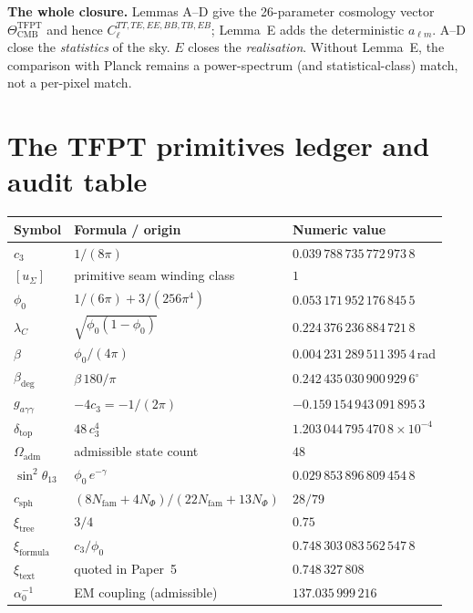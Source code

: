 \bigskip

\noindent
\textbf{The whole closure.}  Lemmas A--D give the 26-parameter
cosmology vector
\(\Theta_{\mathrm{CMB}}^{\mathrm{TFPT}}\) and hence
\(C_\ell^{TT,TE,EE,BB,TB,EB}\); Lemma~E adds the deterministic
\(a_{\ell m}\).  A--D close the \emph{statistics} of the sky.
\(E\) closes the \emph{realisation}.  Without Lemma~E, the comparison
with Planck remains a power-spectrum (and statistical-class) match,
not a per-pixel match.

\section{The TFPT primitives ledger and audit table}
\label{sec:ledger}

\begin{center}
\renewcommand{\arraystretch}{1.05}
\begin{tabular}{@{}lll@{}}
\toprule
\textbf{Symbol} & \textbf{Formula / origin} & \textbf{Numeric value} \\
\midrule
\(c_3\)               & \(1/(8\pi)\)
& \(0.039\,788\,735\,772\,973\,8\) \\
\([u_\Sigma]\)            & primitive seam winding class
& \(1\) \\
\(\phi_0\)                 & \(1/(6\pi)+3/(256\pi^4)\)
& \(0.053\,171\,952\,176\,845\,5\) \\
\(\lambda_C\)             & \(\sqrt{\phi_0(1-\phi_0)}\)
& \(0.224\,376\,236\,884\,721\,8\) \\
\(\beta\)  & \(\phi_0/(4\pi)\)
& \(0.004\,231\,289\,511\,395\,4\,\)rad \\
\(\beta_{\mathrm{deg}}\)  & \(\beta\,180/\pi\)
& \(0.242\,435\,030\,900\,929\,6^\circ\) \\
\(g_{a\gamma\gamma}\)     & \(-4c_3=-1/(2\pi)\)
& \(-0.159\,154\,943\,091\,895\,3\) \\
\(\delta_{\mathrm{top}}\) & \(48\,c_3^4\)
& \(1.203\,044\,795\,470\,8\times10^{-4}\) \\
\(\Omega_{\mathrm{adm}}\)& admissible state count
& \(48\) \\
\(\sin^2\theta_{13}\)     & \(\phi_0\,e^{-\gamma}\)
& \(0.029\,853\,896\,809\,454\,8\) \\
\(c_{\mathrm{sph}}\)      & \((8N_{\mathrm{fam}}+4N_\Phi)/(22N_{\mathrm{fam}}+13N_\Phi)\) & \(28/79\) \\
\(\xi_{\mathrm{tree}}\)   & \(3/4\)                                    & \(0.75\) \\
\(\xi_{\mathrm{formula}}\)& \(c_3/\phi_0\)                          & \(0.748\,303\,083\,562\,547\,8\) \\
\(\xi_{\mathrm{text}}\)   & quoted in Paper~5                          & \(0.748\,327\,808\) \\
\(\alpha_0^{-1}\)         & EM coupling (admissible) & \(137.035\,999\,216\) \\
\bottomrule
\end{tabular}
\end{center}

